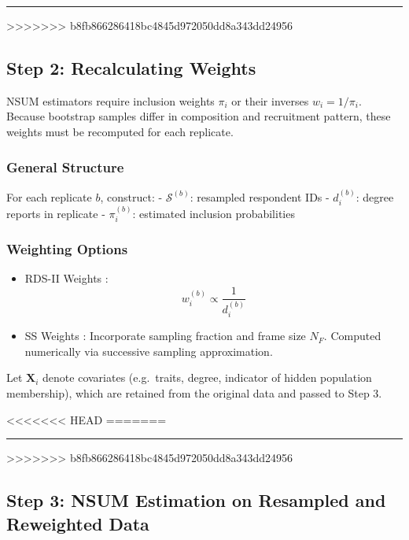 \documentclass[
  12pt,
  letterpaper,
  DIV=11,
  numbers=noendperiod]{scrartcl}
\theoremstyle{plain}
\theoremstyle{definition}
\begin{document}
{\begin{center}\rule{0.5\linewidth}{0.5pt}\end{center}
>>>>>>> b8fb866286418bc4845d972050dd8a343dd24956

\subsection{Step 2: Recalculating
Weights}\label{step-2-recalculating-weights}

NSUM estimators require inclusion weights \(\pi_i\) or their inverses
\(w_i = 1 / \pi_i\). Because bootstrap samples differ in composition and
recruitment pattern, these weights must be recomputed for each
replicate.

\subsubsection{General Structure}\label{general-structure}

For each replicate \(b\), construct: - \(\mathcal{S}^{(b)}\): resampled
respondent IDs - \(d_i^{(b)}\): degree reports in replicate -
\(\pi_i^{(b)}\): estimated inclusion probabilities

\subsubsection{Weighting Options}\label{weighting-options}

\begin{itemize}
\item
  RDS-II Weights \autocite{volz08-probability}: \[
  w_i^{(b)} \propto \frac{1}{d_i^{(b)}}
  \]
\item
  SS Weights \autocite{gile11-improved}: Incorporate sampling fraction
  and frame size \(N_F\). Computed numerically via successive sampling
  approximation.
\end{itemize}

Let \(\mathbf{X}_i\) denote covariates (e.g.~traits, degree, indicator
of hidden population membership), which are retained from the original
data and passed to Step 3.

<<<<<<< HEAD
=======
\begin{center}\rule{0.5\linewidth}{0.5pt}\end{center}

>>>>>>> b8fb866286418bc4845d972050dd8a343dd24956
\subsection{Step 3: NSUM Estimation on Resampled and Reweighted
Data}\label{step-3-nsum-estimation-on-resampled-and-reweighted-data}

}
\end{document}
